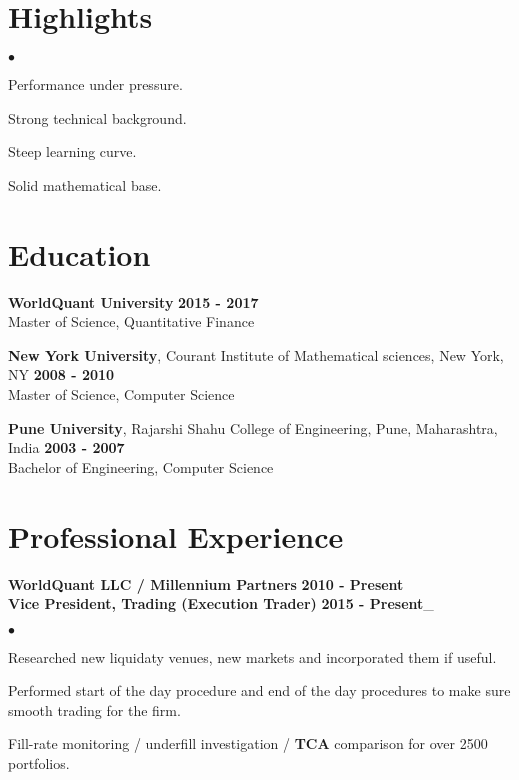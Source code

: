 \documentclass[margin,line]{res}
\newenvironment{list2}{
  \begin{list}{$\bullet$}{%
      \setlength{\itemsep}{0.05in}
      \setlength{\parsep}{0in} \setlength{\parskip}{0in}
      \setlength{\topsep}{-0.1in} \setlength{\partopsep}{0in}
      \setlength{\leftmargin}{0.2in}}}{\end{list}}
\begin{document}
\address{ 1300, Hope St, Stamford, CT 06907. $\bullet$ 917-558-4825 }
\address{ \href{mailto: harsshal@nyu.edu} {harsshal@nyu.edu} $\bullet$
          \href{https://sites.google.com/site/harsshal/}{https://sites.google.com/site/harsshal/} }

\vspace {0.1in}
\begin{resume}
\section{\sc Highlights}
\begin{list2}
\begin{minipage}{0.5\linewidth}
\item Performance under pressure.
\item Strong technical background.
\end{minipage}
\begin{minipage}{0.4\linewidth}
\item Steep learning curve.
\item Solid mathematical base.
\end{minipage}
\end{list2}

\section{\sc Education}
{\bf WorldQuant University} \hfill {\bf  2015 - 2017}\\
Master of Science, Quantitative Finance

{\bf New York University}, Courant Institute of Mathematical sciences, New York, NY \hfill {\bf 2008 - 2010}\\
Master of Science, Computer Science

{\bf Pune University}, Rajarshi Shahu College of Engineering, Pune, Maharashtra, India \hfill{\bf 2003 - 2007}\\
Bachelor of Engineering, Computer Science

\section{\sc Professional Experience}
{\bf WorldQuant LLC / Millennium Partners} \hfill {\bf 2010 - Present}\\
{\bf Vice President, Trading (Execution Trader)} \hfill {\bf 2015 - Present}\_
\begin{list2}
\item Researched new liquidaty venues, new markets and incorporated them if useful.
\item Performed start of the day procedure and end of the day procedures to make sure smooth trading for the firm.
\item Fill-rate monitoring / underfill investigation / {\bf TCA} comparison for over 2500 portfolios.


\end{list2}
\end{resume}
\end{document}

